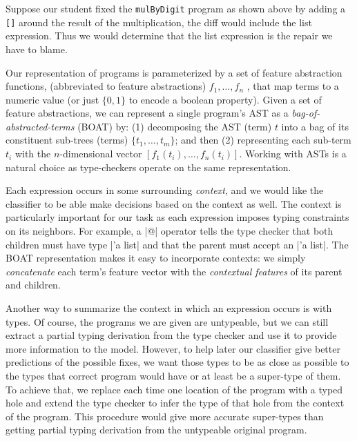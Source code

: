  Suppose our student fixed the \texttt{mulByDigit} program as
shown above by adding a \texttt{[]} around the result of the multiplication, the
diff would include the list expression. Thus we would determine that the list
expression is the repair we have to blame.

 Our representation of programs is
parameterized by a set of feature abstraction functions, (abbreviated to feature
abstractions) $f_1, \ldots, f_n$ , that map terms to a numeric value (or just
$\{0, 1\}$ to encode a boolean property). Given a set of feature abstractions,
we can represent a single program's AST as a \emph{bag-of-abstracted-terms}
(BOAT) by:
%
(1) decomposing the AST (term) $t$ into a bag of its constituent sub-trees
(terms) $\{t_1, \ldots, t_m\}$; and then
%
(2) representing each sub-term $t_i$ with the $n$-dimensional vector $[f_1(t_i),
\ldots, f_n(t_i)]$. Working with ASTs is a natural choice as type-checkers
operate on the same representation.

 Each expression occurs in some surrounding
\emph{context}, and we would like the classifier to be able make decisions based
on the context as well. The context is particularly important for our task as
each expression imposes typing constraints on its neighbors. For example, a |@|
operator tells the type checker that both children must have type |'a list| and
that the parent must accept an |'a list|. The BOAT representation makes it easy
to incorporate contexts: we simply \emph{concatenate} each term’s feature vector
with the \emph{contextual features} of its parent and children.

 Another way to summarize the context in which an
expression occurs is with types. Of course, the programs we are given are
untypeable, but we can still extract a partial typing derivation from the type
checker and use it to provide more information to the model. However, to help
later our classifier give better predictions of the possible fixes, we want
those types to be as close as possible to the types that correct program would
have or at least be a super-type of them. To achieve that, we replace each time
one location of the program with a typed hole and extend the type checker to
infer the type of that hole from the context of the program. This procedure
would give more accurate super-types than getting partial typing derivation from
the untypeable original program.



